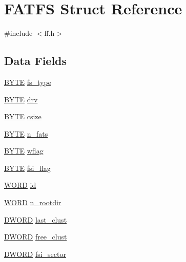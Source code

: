 \hypertarget{structFATFS}{\section{F\-A\-T\-F\-S Struct Reference}
\label{structFATFS}
}


{\ttfamily \#include $<$ff.\-h$>$}

\subsection*{Data Fields}
\begin{DoxyCompactItemize}
\item 
\hyperlink{integer_8h_a4ae1dab0fb4b072a66584546209e7d58}{B\-Y\-T\-E} \hyperlink{structFATFS_add27d97babe807b573eac98a71dc4ae5}{fs\-\_\-type}
\item 
\hyperlink{integer_8h_a4ae1dab0fb4b072a66584546209e7d58}{B\-Y\-T\-E} \hyperlink{structFATFS_a6a791560e2687e8b1569bfce61208d2d}{drv}
\item 
\hyperlink{integer_8h_a4ae1dab0fb4b072a66584546209e7d58}{B\-Y\-T\-E} \hyperlink{structFATFS_a504a1175f6dcc9a854b9da94463bd108}{csize}
\item 
\hyperlink{integer_8h_a4ae1dab0fb4b072a66584546209e7d58}{B\-Y\-T\-E} \hyperlink{structFATFS_a56716c7e7ac10cf46e73ffb2a2e9b545}{n\-\_\-fats}
\item 
\hyperlink{integer_8h_a4ae1dab0fb4b072a66584546209e7d58}{B\-Y\-T\-E} \hyperlink{structFATFS_a647e43c9ccae94b7274793d1909897de}{wflag}
\item 
\hyperlink{integer_8h_a4ae1dab0fb4b072a66584546209e7d58}{B\-Y\-T\-E} \hyperlink{structFATFS_a84e9cdc5a6a8e33ea7ec192058abf161}{fsi\-\_\-flag}
\item 
\hyperlink{integer_8h_a197942eefa7db30960ae396d68339b97}{W\-O\-R\-D} \hyperlink{structFATFS_a417095d7c20d56d417dc0998e0dd5a5c}{id}
\item 
\hyperlink{integer_8h_a197942eefa7db30960ae396d68339b97}{W\-O\-R\-D} \hyperlink{structFATFS_a189a00aa038044ffad0fc7f7dcf2aae1}{n\-\_\-rootdir}
\item 
\hyperlink{integer_8h_ad342ac907eb044443153a22f964bf0af}{D\-W\-O\-R\-D} \hyperlink{structFATFS_ad315def289218e26ab78ff90fde700d1}{last\-\_\-clust}
\item 
\hyperlink{integer_8h_ad342ac907eb044443153a22f964bf0af}{D\-W\-O\-R\-D} \hyperlink{structFATFS_a5fb49e6ac511bd97eaffdd636d0e4165}{free\-\_\-clust}
\item 
\hyperlink{integer_8h_ad342ac907eb044443153a22f964bf0af}{D\-W\-O\-R\-D} \hyperlink{structFATFS_a4900e785d26dfed6e456ceeb59ec29a7}{fsi\-\_\-sector}

\end{DoxyCompactItemize}

